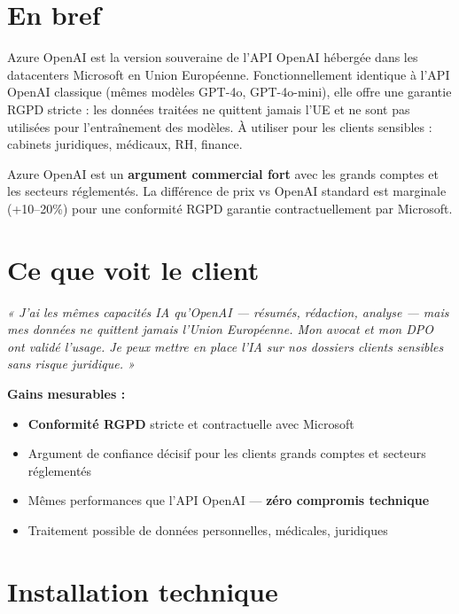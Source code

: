 \documentclass[11pt, a4paper]{article}
\begin{document}
\ficheHeader

\section*{En bref}
Azure OpenAI est la version souveraine de l'API OpenAI hébergée dans les datacenters Microsoft en Union Européenne. Fonctionnellement identique à l'API OpenAI classique (mêmes modèles GPT-4o, GPT-4o-mini), elle offre une garantie RGPD stricte : les données traitées ne quittent jamais l'UE et ne sont pas utilisées pour l'entraînement des modèles. À utiliser pour les clients sensibles : cabinets juridiques, médicaux, RH, finance.

\begin{pointcle}
  Azure OpenAI est un \textbf{argument commercial fort} avec les grands comptes et les secteurs réglementés. La différence de prix vs OpenAI standard est marginale (+10–20\%) pour une conformité RGPD garantie contractuellement par Microsoft.
\end{pointcle}

\section{Ce que voit le client}

\begin{clientbox}
  \textit{« J'ai les mêmes capacités IA qu'OpenAI — résumés, rédaction, analyse — mais mes données ne quittent jamais l'Union Européenne. Mon avocat et mon DPO ont validé l'usage. Je peux mettre en place l'IA sur nos dossiers clients sensibles sans risque juridique. »}
\end{clientbox}

\textbf{Gains mesurables :}
\begin{itemize}
  \item \textbf{Conformité RGPD} stricte et contractuelle avec Microsoft
  \item Argument de confiance décisif pour les clients grands comptes et secteurs réglementés
  \item Mêmes performances que l'API OpenAI — \textbf{zéro compromis technique}
  \item Traitement possible de données personnelles, médicales, juridiques
\end{itemize}

\section{Installation technique}
\end{document}
